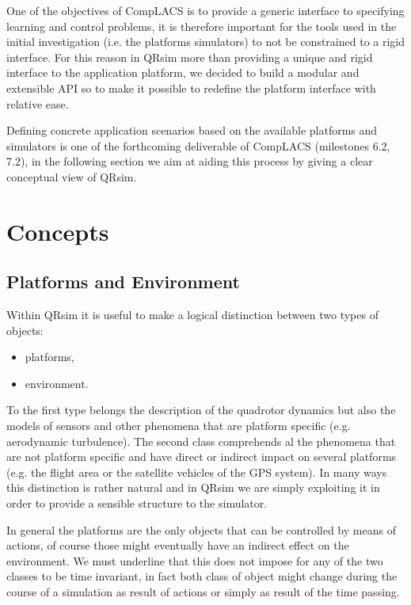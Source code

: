 \documentclass[a4paper,11pt]{report}
\newcommand{\sname}{QRsim\xspace}
\begin{document}
One of the objectives of {CompLACS} is to provide a generic interface to specifying learning and control problems, it is therefore important for the tools used in the initial investigation (i.e. the platforms simulators) to not be constrained to a rigid interface. 
For this reason in \sname more than providing a unique and rigid interface to the application platform, we decided to build a modular and extensible API so to make it possible to redefine the platform interface with relative ease. 

Defining concrete application scenarios based on the available platforms and simulators is one of the forthcoming deliverable of {CompLACS} (milestones 6.2, 7.2), in the following section we aim at aiding this process by giving a clear conceptual view of \sname. 

\section{Concepts}



\subsection{Platforms and Environment}\label{sec:platandenv}
Within \sname it is useful to make a logical distinction between two types of objects:
\begin{itemize}
\item platforms,
\item environment.
\end{itemize}
To the first type belongs the description of the quadrotor dynamics but also the models of sensors and other phenomena that are platform specific (e.g. aerodynamic turbulence). The second class comprehends al the phenomena that are not platform specific and have direct or indirect impact on several platforms (e.g. the flight area or the satellite vehicles of the GPS system).
In many ways this distinction is rather natural and in \sname we are simply exploiting it in order to provide a sensible structure to the simulator.

In general the platforms are the only objects that can be controlled by means of actions, of course those might eventually have an indirect effect on the environment. We must underline that this does not impose for any of the two classes to be time invariant, in fact both class of object might change during the course of a simulation as result of actions or simply as result of the time passing.
\end{document}
